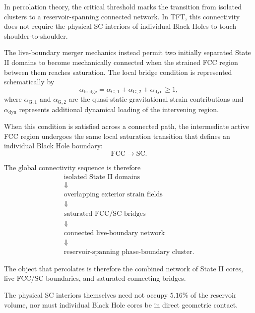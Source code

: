 In percolation theory, the critical threshold marks the transition from
isolated clusters to a reservoir-spanning connected network. In TFT, this
connectivity does not require the physical SC interiors of individual Black
Holes to touch shoulder-to-shoulder.

The live-boundary merger mechanics instead permit two initially separated
State II domains to become mechanically connected when the strained FCC
region between them reaches saturation. The local bridge condition is
represented schematically by
\begin{equation}
    \alpha_{\mathrm{bridge}}
    =
    \alpha_{\mathrm{G},1}
    +
    \alpha_{\mathrm{G},2}
    +
    \alpha_{\mathrm{dyn}}
    \geq
    1,
\end{equation}
where
\(\alpha_{\mathrm{G},1}\)
and
\(\alpha_{\mathrm{G},2}\)
are the quasi-static gravitational strain contributions and
\(\alpha_{\mathrm{dyn}}\)
represents additional dynamical loading of the intervening region.

When this condition is satisfied across a connected path, the intermediate
active FCC region undergoes the same local saturation transition that defines
an individual Black Hole boundary:
\begin{equation}
    \mathrm{FCC}
    \rightarrow
    \mathrm{SC}.
\end{equation}

The global connectivity sequence is therefore
\begin{equation}
\begin{array}{c}
    \text{isolated State II domains}
    \\
    \Downarrow
    \\
    \text{overlapping exterior strain fields}
    \\
    \Downarrow
    \\
    \text{saturated FCC/SC bridges}
    \\
    \Downarrow
    \\
    \text{connected live-boundary network}
    \\
    \Downarrow
    \\
    \text{reservoir-spanning phase-boundary cluster}.
\end{array}
\end{equation}

The object that percolates is therefore the combined network of State II
cores, live FCC/SC boundaries, and saturated connecting bridges.

The physical SC interiors themselves need not occupy \(5.16\%\) of the
reservoir volume, nor must individual Black Hole cores be in direct geometric
contact.

